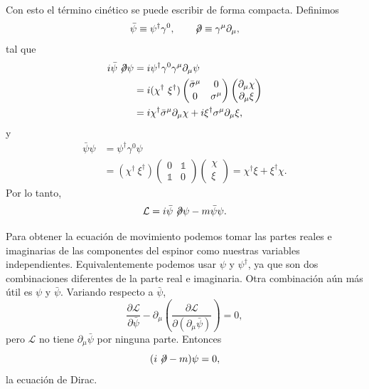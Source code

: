 \documentclass[11pt,a4paper]{article}
\newcommand{\concept}[1]{\textcolor{concept-green}{#1}}
\newcommand{\slashedpartial}{\not\!\partial}
\begin{document}
Con esto el término cinético se puede escribir de forma compacta. Definimos
\[
  \bar\psi\equiv\psi^\dagger\gamma^0,
  \qquad
  \slashedpartial\equiv\gamma^\mu\partial_\mu,
\]
tal que
\begin{align*}
  i\bar\psi\slashedpartial\psi
  &=i\psi^\dagger\gamma^0\gamma^\mu\partial_\mu\psi\\
  &=i(\chi^\dagger\ \xi^\dagger)
    \begin{pmatrix}
      \bar\sigma^\mu&0\\
      0&\sigma^\mu
    \end{pmatrix}
    \begin{pmatrix}
      \partial_\mu\chi\\
      \partial_\mu\xi
    \end{pmatrix}\\
  &=i\chi^\dagger\bar\sigma^\mu\partial_\mu\chi
    +i\xi^\dagger\sigma^\mu\partial_\mu\xi,
\end{align*}
y
\begin{align*}
  \bar\psi\psi
  &=\psi^\dagger\gamma^0\psi\\
  &=(\chi^\dagger\ \xi^\dagger)
    \begin{pmatrix}
      0&\mathbb{1}\\
      \mathbb{1}&0
    \end{pmatrix}
    \begin{pmatrix}
      \chi\\
      \xi
    \end{pmatrix}
   =\chi^\dagger\xi+\xi^\dagger\chi.
\end{align*}
Por lo tanto,
\[
  \mathcal L=i\bar\psi\slashedpartial\psi-m\bar\psi\psi.
\]

Para obtener la ecuación de movimiento podemos tomar las partes reales e imaginarias de las componentes del espinor como nuestras variables independientes. Equivalentemente podemos usar $\psi$ y $\psi^\dagger$, ya que son dos combinaciones diferentes de la parte real e imaginaria. Otra combinación aún más útil es $\psi$ y $\bar\psi$. Variando respecto a $\bar\psi$,
\[
  \frac{\partial\mathcal L}{\partial\bar\psi}
  -\partial_\mu\left(
    \frac{\partial\mathcal L}{\partial(\partial_\mu\bar\psi)}
  \right)=0,
\]
pero $\mathcal L$ no tiene $\partial_\mu\bar\psi$ por ninguna parte. Entonces
\[
  (i\slashedpartial-m)\psi=0,
\]
la \concept{ecuación de Dirac}.
\end{document}
